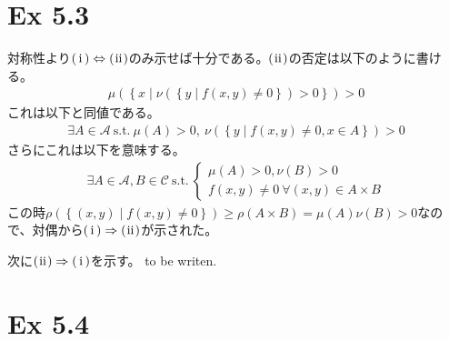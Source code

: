 \documentclass{article}
\begin{document}
\section{Ex 5.3}
対称性より$\rm(\hspace{.18em}i\hspace{.18em}) \Leftrightarrow \rm(\hspace{.08em}ii\hspace{.08em})$のみ示せば十分である。$\rm(\hspace{.08em}ii\hspace{.08em})$の否定は以下のように書ける。
\begin{align*}
	\mu\left( \left\{ x \mid \nu\left( \left\{ y \mid f(x, y) \neq 0 \right\} \right) > 0 \right\} \right) > 0
\end{align*}
これは以下と同値である。
\begin{align*}
	\exists A \in \mathcal{A}\ \text{s.t.}\ \mu(A) > 0,\ \nu\left( \left\{ y \mid f(x, y) \neq 0 , x\in A \right\} \right) > 0
\end{align*}
さらにこれは以下を意味する。
\begin{align*}
	\exists A \in \mathcal{A}, B \in \mathcal{C}\ \text{s.t.}\ \begin{cases} \mu(A) > 0, \nu(B) > 0 \\[8pt] f(x, y) \neq 0\ \forall (x, y) \in A \times B \end{cases}
\end{align*}
この時$\rho(\left\{ (x, y)\mid f(x, y) \neq 0 \right\}) \geq \rho(A \times B) = \mu(A) \nu(B) > 0$なので、対偶から$\rm(\hspace{.18em}i\hspace{.18em}) \Rightarrow \rm(\hspace{.08em}ii\hspace{.08em})$が示された。

次に$\rm(\hspace{.08em}ii\hspace{.08em}) \Rightarrow \rm(\hspace{.18em}i\hspace{.18em})$を示す。 to be writen.

\section{Ex 5.4}
\end{document}
